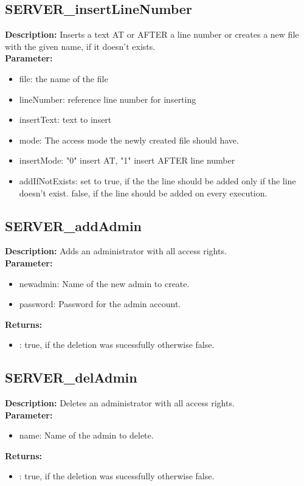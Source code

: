 \subsection{SERVER\_insertLineNumber}
\textbf{Description:} Inserts a text AT or AFTER a line number or creates a new file with the given name, if it doesn't exists.\\
\textbf{Parameter:}
\begin{itemize}
\item file: the name of the file
\item lineNumber: reference line number for inserting
\item insertText: text to insert
\item mode: The access mode the newly created file should have.
\item insertMode: "0" insert AT, "1" insert AFTER line number
\item addIfNotExists: set to true, if the the line should be added only if the line doesn't exist. false, if the line should be added on every execution.
\end{itemize}

\subsection{SERVER\_addAdmin}
\textbf{Description:} Adds an administrator with all access rights.\\
\textbf{Parameter:}
\begin{itemize}
\item newadmin: Name of the new admin to create.
\item password: Password for the admin account.
\end{itemize}
\textbf{Returns:}
\begin{itemize}
\item : true, if the deletion was sucessfully otherwise false.
\end{itemize}

\subsection{SERVER\_delAdmin}
\textbf{Description:} Deletes an administrator with all access rights.\\
\textbf{Parameter:}
\begin{itemize}
\item name: Name of the admin to delete.
\end{itemize}
\textbf{Returns:}
\begin{itemize}
\item : true, if the deletion was sucessfully otherwise false.
\end{itemize}

